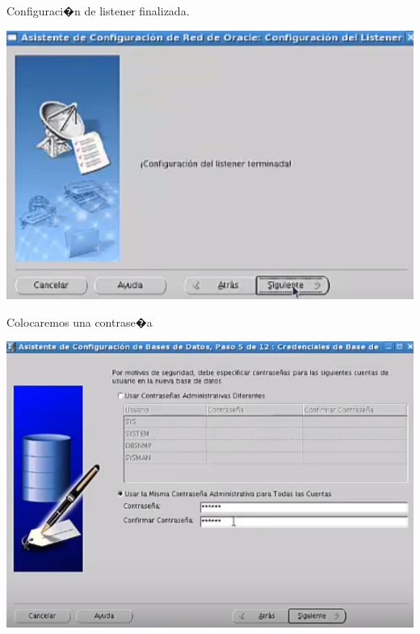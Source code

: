 \documentclass[12pt,letterpaper]{article}
\begin{document}
Configuraci�n de listener finalizada.
\begin{center}
	\includegraphics[width=15cm]{oraclelinux/39.png}
\end{center}
\newpage
Colocaremos una contrase�a \\

\begin{center}
	\includegraphics[width=15cm]{oraclelinux/40.png}
\end{center}
\end{document}
